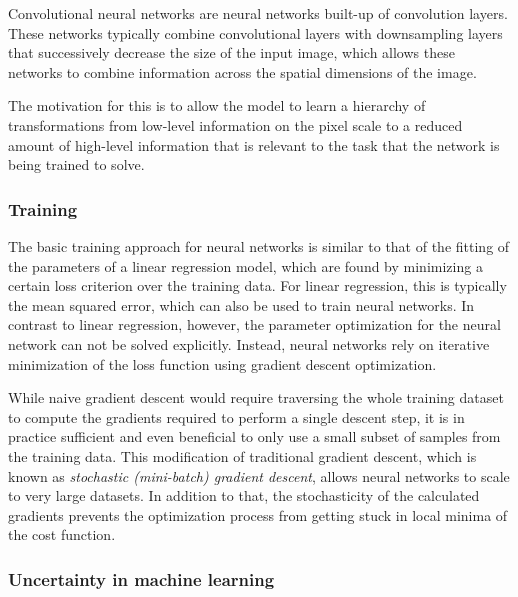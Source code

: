 Convolutional neural networks are neural networks built-up of convolution
layers. These networks typically combine convolutional layers with downsampling
layers that successively decrease the size of the input image, which allows these
networks to combine information across the spatial dimensions of the image.

The motivation for this is to allow the model to learn a hierarchy of
transformations from low-level information on the pixel scale to a reduced
amount of high-level information that is relevant to the task that the
network is being trained to solve.

\subsubsection{Training}

The basic training approach for neural networks is similar to that of the
fitting of the parameters of a linear regression model, which are found by
minimizing a certain loss criterion over the training data. For linear
regression, this is typically the mean squared error, which can also be used to
train neural networks. In contrast to linear regression, however, the parameter
optimization for the neural network can not be solved explicitly. Instead,
neural networks rely on iterative minimization of the loss function using
gradient descent optimization.

While naive gradient descent would require traversing the whole training dataset
to compute the gradients required to perform a single descent step, it is in
practice sufficient and even beneficial to only use a small subset of samples
from the training data. This modification of traditional gradient descent, which
is known as \textit{stochastic (mini-batch) gradient descent}, allows neural
networks to scale  to very large datasets. In addition to that, the
stochasticity of the calculated gradients prevents the optimization process from
getting stuck in local minima of the cost function.

\subsubsection{Uncertainty in machine learning}

